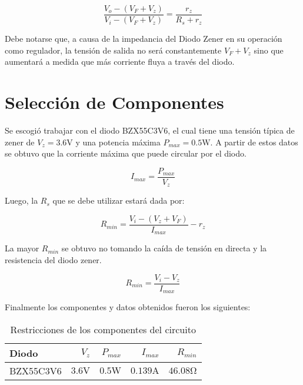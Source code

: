 \begin{equation}
    \frac{V_o - (V_F + V_z)}{V_i - (V_F + V_z)}=\frac{r_z}{R_s + r_z}
    \label{eqn:transferencia}
\end{equation}

\begin{figure}[ht]
    \begin{center}
        
        \label{fig:limitador_activado}
    \end{center}
\end{figure}

Debe notarse que, a causa de la impedancia del Diodo Zener en su operación como regulador, la tensión de salida no será constantemente $V_F+V_z$ sino que aumentará a medida que más corriente fluya a través del diodo.

\section{Selección de Componentes}

Se escogió trabajar con el diodo BZX55C3V6, el cual tiene una tensión típica de zener de $V_z = 3.6 \si{\volt}$ y una potencia máxima $P_{max} = 0.5 \si{\watt}$. A partir de estos datos se obtuvo que la corriente máxima que puede circular por el diodo.

\begin{equation}
    I_{max}=\frac{P_{max}}{V_z}
\end{equation}

Luego, la $R_s$ que se debe utilizar estará dada por:

\begin{equation}
    R_{min}=\frac{V_i-(V_z+V_F)}{I_{max}}-r_z
\end{equation}

La mayor $R_{min}$ se obtuvo no tomando la caída de tensión en directa y la resistencia del diodo zener.

\begin{equation}
    R_{min}=\frac{V_i-V_z}{I_{max}}
\end{equation}

Finalmente los componentes y datos obtenidos fueron los siguientes:

\begin{table}[ht]
    \begin{center}
        \begin{tabular}{|l|r|r|r|r|}
            \hline
            Diodo & $V_z$ & $P_{max}$ & $I_{max}$ & $R_{min}$ \\
            \hline
            BZX55C3V6 & $3.6 \si{\volt}$ & $0.5 \si{\watt}$ & $0.139 \si{\ampere}$ & $46.08 \si{\ohm}$ \\
            \hline
        \end{tabular}
        \caption{Restricciones de los componentes del circuito}
        \label{tabla_limitador}
    \end{center}
\end{table}

